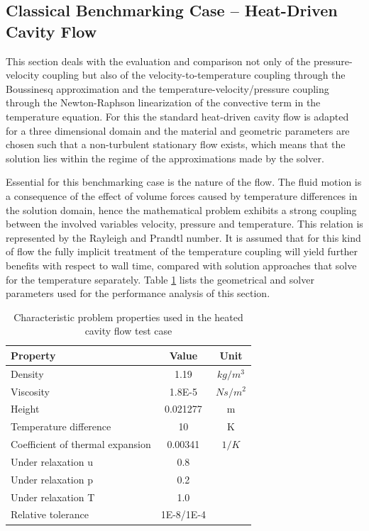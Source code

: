 \subsection{Classical Benchmarking Case -- Heat-Driven Cavity Flow}

This section deals with the evaluation and comparison not only of the pressure-velocity coupling but also of the velocity-to-temperature coupling through the Boussinesq approximation and the temperature-velocity/pressure coupling through the Newton-Raphson linearization of the convective term in the temperature equation. For this the standard heat-driven cavity flow \cite{christon02,vahl83} is adapted for a three dimensional domain and the material and geometric parameters are chosen such that a non-turbulent stationary flow exists, which means that the solution lies within the regime of the approximations made by the solver.

Essential for this benchmarking case is the nature of the flow. The fluid motion is a consequence of the effect of volume forces caused by temperature differences in the solution domain, hence the mathematical problem exhibits a strong coupling between the involved variables velocity, pressure and temperature. This relation is represented by the Rayleigh and Prandtl number. It is assumed that for this kind of flow the fully implicit treatment of the temperature coupling will yield further benefits with respect to wall time, compared with solution approaches that solve for the temperature separately. Table \ref{tab:cavity} lists the geometrical and solver parameters used for the performance analysis of this section.

\begin{table}[h!]\centering
  \caption{Characteristic problem properties used in the heated cavity flow test case}
  \begin{tabular}{lcc}\toprule
    Property & Value & Unit \\
    \midrule
    \rowcolor{black!20} Density            & 1.19      & $kg/m^3$  \\
    \rowcolor{black!00} Viscosity          & 1.8E-5    & $Ns/m^2$  \\
    \rowcolor{black!20} Height             & 0.021277  & m         \\
    \rowcolor{black!00} Temperature difference & 10    & K         \\
    \rowcolor{black!20} Coefficient of thermal expansion & 0.00341 & $1/K$ \\
    \rowcolor{black!00} Under relaxation u & 0.8       &           \\
    \rowcolor{black!20} Under relaxation p & 0.2       &           \\
    \rowcolor{black!00} Under relaxation T & 1.0       &           \\
    \rowcolor{black!20} Relative tolerance & 1E-8/1E-4 &
  \end{tabular}
  \label{tab:cavity}
\end{table}

